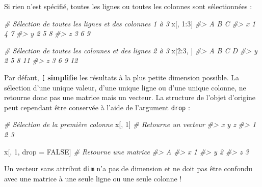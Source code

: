 \documentclass[
  french,
]{scrbook}
\newenvironment{Shaded}{\begin{snugshade}}{\end{snugshade}}
\newcommand{\CommentTok}[1]{\textcolor[rgb]{0.56,0.35,0.01}{\textit{#1}}}
\newcommand{\ConstantTok}[1]{\textcolor[rgb]{0.00,0.00,0.00}{#1}}
\newcommand{\DecValTok}[1]{\textcolor[rgb]{0.00,0.00,0.81}{#1}}
\newcommand{\NormalTok}[1]{#1}
\newcommand{\OtherTok}[1]{\textcolor[rgb]{0.56,0.35,0.01}{#1}}
\newcommand{\SpecialCharTok}[1]{\textcolor[rgb]{0.00,0.00,0.00}{#1}}
\begin{document}
Si rien n'est spécifié, toutes les lignes ou toutes les colonnes sont sélectionnées :

\begin{Shaded}
\begin{Highlighting}[]
\CommentTok{\# Sélection de toutes les lignes et des colonnes 1 à 3}
\NormalTok{x[, }\DecValTok{1}\SpecialCharTok{:}\DecValTok{3}\NormalTok{]}
\CommentTok{\#\textgreater{}   A B C}
\CommentTok{\#\textgreater{} x 1 4 7}
\CommentTok{\#\textgreater{} y 2 5 8}
\CommentTok{\#\textgreater{} z 3 6 9}

\CommentTok{\# Sélection de toutes les colonnes et des lignes 2 à 3}
\NormalTok{x[}\DecValTok{2}\SpecialCharTok{:}\DecValTok{3}\NormalTok{, ]}
\CommentTok{\#\textgreater{}   A B C  D}
\CommentTok{\#\textgreater{} y 2 5 8 11}
\CommentTok{\#\textgreater{} z 3 6 9 12}
\end{Highlighting}
\end{Shaded}

Par défaut, \texttt{{[}} \textbf{simplifie} les résultats à la plus petite dimension possible. La sélection d'une unique valeur, d'une unique ligne ou d'une unique colonne, ne retourne donc pas une matrice mais un vecteur. La structure de l'objet d'origine peut cependant être conservée à l'aide de l'argument \texttt{drop} :

\begin{Shaded}
\begin{Highlighting}[]
\CommentTok{\# Sélection de la première colonne}
\NormalTok{x[, }\DecValTok{1}\NormalTok{] }\CommentTok{\# Retourne un vecteur}
\CommentTok{\#\textgreater{} x y z }
\CommentTok{\#\textgreater{} 1 2 3}

\NormalTok{x[, }\DecValTok{1}\NormalTok{, drop }\OtherTok{=} \ConstantTok{FALSE}\NormalTok{] }\CommentTok{\# Retourne une matrice}
\CommentTok{\#\textgreater{}   A}
\CommentTok{\#\textgreater{} x 1}
\CommentTok{\#\textgreater{} y 2}
\CommentTok{\#\textgreater{} z 3}
\end{Highlighting}
\end{Shaded}

\begin{tcolorbox}[fonttitle=\sffamily\bfseries\large,title=Avertissement,colframe=darkyellow]

Un vecteur sans attribut \texttt{dim} n'a pas de dimension et ne doit pas être confondu avec une matrice à une seule ligne ou une seule colonne !

\end{tcolorbox}
\end{document}
